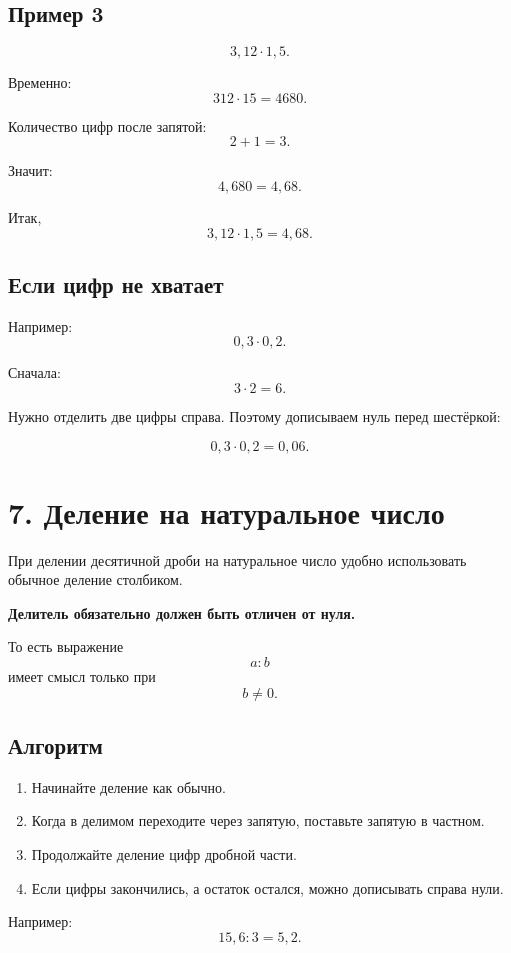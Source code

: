\documentclass[a4paper,12pt]{article}
\newcommand{\sectiontitle}[1]{%
  \section*{\color{darkaccent}#1}%
}
\newcommand{\important}[1]{%
  \textbf{\color{darkaccent}#1}%
}
\begin{document}
\subsection*{\color{accent}Пример 3}

\[
3{,}12\cdot1{,}5.
\]

Временно:
\[
312\cdot15=4680.
\]

Количество цифр после запятой:
\[
2+1=3.
\]

Значит:
\[
4{,}680=4{,}68.
\]

Итак,
\[
\boxed{3{,}12\cdot1{,}5=4{,}68}.
\]

\subsection*{\color{accent}Если цифр не хватает}

Например:
\[
0{,}3\cdot0{,}2.
\]

Сначала:
\[
3\cdot2=6.
\]

Нужно отделить две цифры справа.
Поэтому дописываем нуль перед шестёркой:

\[
\boxed{0{,}3\cdot0{,}2=0{,}06}.
\]


\sectiontitle{7. Деление на натуральное число}

При делении десятичной дроби на натуральное число удобно
использовать обычное деление столбиком.

\important{Делитель обязательно должен быть отличен от нуля.}

То есть выражение
\[
a:b
\]
имеет смысл только при
\[
b\ne0.
\]

\subsection*{\color{accent}Алгоритм}

\begin{enumerate}
  \item Начинайте деление как обычно.
  \item Когда в делимом переходите через запятую,
        поставьте запятую в частном.
  \item Продолжайте деление цифр дробной части.
  \item Если цифры закончились, а остаток остался,
        можно дописывать справа нули.
\end{enumerate}

Например:
\[
15{,}6:3=5{,}2.
\]
\end{document}
